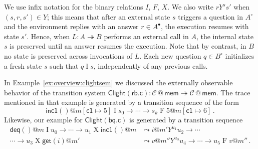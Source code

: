 \documentclass[acmsmall,screen,review,anonymous]{acmart}
\newcommand{\kw}[1]{\ensuremath{ \mathsf{#1} }}
\newcommand{\que}{\circ}
\newcommand{\ans}{\bullet}
\begin{document}
We use infix notation for the binary relations $I$, $F$, $X$.
We also write $r \mathrel{Y^s} s'$ when $(s, r, s') \in Y$;
this means that
after an external state $s$ triggers a question in $A^\que$ %
and the environment replies with an answer $r \in A^\ans$,
the execution resumes with state $s'$.
Hence,
when $L : A \twoheadrightarrow B$
performs an external call in $A$,
the internal state $s$ is preserved
until an answer resumes the execution.
Note that by contrast, in $B$
no state is preserved across invocations of $L$.
Each new question $q \in B^\que$ initializes a fresh state $s$
such that $q \mathrel{I} s$,
independently of any previous calls. %

\begin{example} \label{ex:base:clightsem} %
In Example~\ref{ex:overview:clightsem}
we discussed the externally observable behavior
of the transition system
$\kw{Clight}(\kw{rb.c}) :
 \mathcal{C} \mathbin@ \kw{mem} \twoheadrightarrow
 \mathcal{C} \mathbin@ \kw{mem}$.
The trace mentioned in that example
is generated by a transition sequence of the form
\[
  \kw{inc1}()@m[\kw{c1} \mapsto 5]
  \mathrel{I}
  s_0 \rightarrow \cdots \rightarrow s_k
  \mathrel{F}
  5@m[\kw{c1} \mapsto 6]
  \,.
\]
Likewise,
our example for
$\kw{Clight}(\kw{bq.c})$
is generated by a transition sequence
\begin{align*}
  \kw{deq}()@m
  \mathrel{I}
  u_0 \rightarrow \cdots \rightarrow u_1
  \mathrel{X}
  \kw{inc1}()@m &\leadsto i@m'
  \mathrel{Y^{u_1}}
  u_2 \rightarrow \cdots \\ \cdots \rightarrow u_3
  \mathrel{X}
  \kw{get}(i)@m' &\leadsto v@m''
  \mathrel{Y^{u_3}}
  u_4 \rightarrow \cdots \rightarrow u_5
  \mathrel{F}
  v@m''
  \,.
\end{align*}
\end{example}

\end{document}
